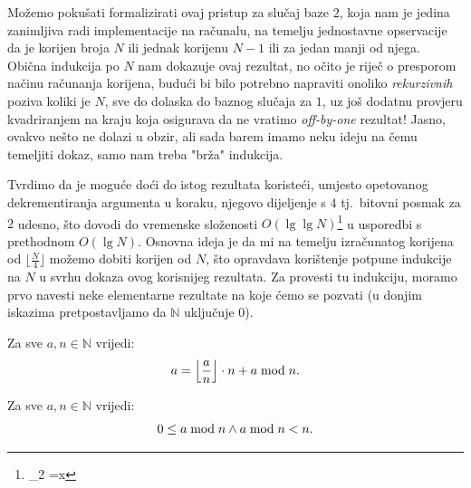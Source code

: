 \documentclass[12pt]{scrartcl}
\begin{document}
Možemo pokušati formalizirati ovaj pristup za slučaj baze $2$, koja nam je jedina zanimljiva radi implementacije na računalu, na temelju
jednostavne opservacije da je korijen broja $N$ ili jednak korijenu $N-1$ ili za jedan manji od njega. Obična indukcija po $N$ nam dokazuje
ovaj rezultat, no očito je riječ o presporom načinu računanja korijena, budući bi bilo potrebno napraviti onoliko \emph{rekurzivnih}
poziva koliki je $N$, sve do dolaska do baznog slučaja za $1$, uz još dodatnu provjeru kvadriranjem na kraju koja osigurava da ne vratimo
\textsl{off-by-one} rezultat! Jasno, ovakvo nešto ne dolazi u obzir, ali sada barem imamo neku ideju na čemu temeljiti dokaz, samo nam treba
"brža" indukcija.

Tvrdimo da je moguće doći do istog rezultata koristeći, umjesto opetovanog dekrementiranja argumenta u koraku, njegovo dijeljenje s $4$
tj.\ bitovni posmak za $2$ udesno, što dovodi do vremenske složenosti $O(\lg\lg N)$\footnote{\log_2 =\lg x} u usporedbi s prethodnom $O(\lg N)$. Osnovna ideja je
da mi na temelju izračunatog korijena od $\lfloor\frac{N}{4}\rfloor$ možemo dobiti korijen od $N$, što opravdava korištenje potpune
indukcije na $N$ u svrhu dokaza ovog korisnijeg rezultata. Za provesti tu indukciju, moramo prvo navesti neke elementarne rezultate
na koje ćemo se pozvati (u donjim iskazima pretpostavljamo da $\mathbb{N}$ uključuje $0$).

\begin{lema}
    Za sve $a,n\in\mathbb{N}$ vrijedi:
    \begin{equation}\label{lm:1}
        a=\left\lfloor\frac{a}{n}\right\rfloor\cdot n + a \bmod n\text.
    \end{equation}
\end{lema}

\begin{lema}
    Za sve $a,n\in\mathbb{N}$ vrijedi:
    \begin{equation}\label{lm:2}
        0 \leq a \bmod n \land a \bmod n < n\text.
    \end{equation}
\end{lema}
\end{document}
